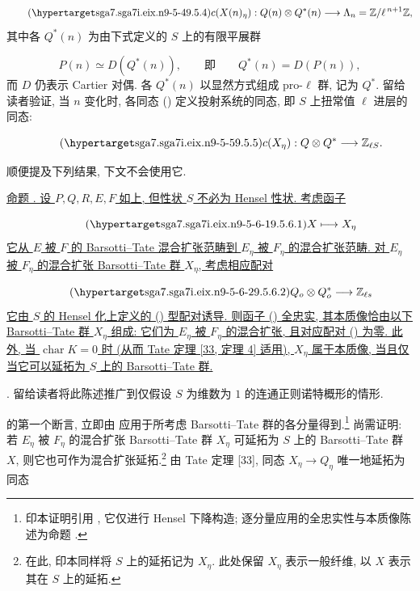 \begin{equation}\tag{\SGARefTarget{sga7.sga7i.eix.n9-5-4}{9.5.4}}
c(X(n)_\eta):Q(n)\otimes Q^*(n)
\longrightarrow\Lambda_n=\mathbb Z/\ell^{\,n+1}\mathbb Z,
\end{equation}
其中各 $Q^*(n)$ 为由下式定义的 $S$ 上的有限平展群

\begin{equation*}
P(n)\simeq D(Q^*(n)),
\qquad\text{即}\qquad Q^*(n)=D(P(n)),
\end{equation*}
而 $D$ 仍表示 Cartier 对偶. 各 $Q^*(n)$ 以显然方式组成 pro-$\ell$ 群, 记为 $Q^*$. 留给读者验证, 当 $n$ 变化时, 各同态 () 定义投射系统的同态, 即 $S$ 上扭常值 $\ell$ 进层的同态:

\begin{equation}\tag{\SGARefTarget{sga7.sga7i.eix.n9-5-5}{9.5.5}}
c(X_\eta):Q\otimes Q^*\longrightarrow\mathbb Z_{\ell S}.
\end{equation}

顺便提及下列结果, 下文不会使用它.

\medskip
\noindent
\underline{命题 . 设 $P,Q,R,E,F$ 如上, 但性状 $S$ 不必为 Hensel 性状. 考虑函子}

\begin{equation}\tag{\SGARefTarget{sga7.sga7i.eix.n9-5-6-1}{9.5.6.1}}
X\longmapsto X_\eta
\end{equation}
\underline{它从 $E$ 被 $F$ 的 Barsotti--Tate 混合扩张范畴到 $E_\eta$ 被 $F_\eta$ 的混合扩张范畴. 对 $E_\eta$ 被 $F_\eta$ 的混合扩张 Barsotti--Tate 群 $X_\eta$, 考虑相应配对}

\begin{equation}\tag{\SGARefTarget{sga7.sga7i.eix.n9-5-6-2}{9.5.6.2}}
Q_o\otimes Q_o^*\longrightarrow\mathbb Z_{\ell s}
\end{equation}
\underline{它由 $S$ 的 Hensel 化上定义的 () 型配对诱导. 则函子 () 全忠实, 其本质像恰由以下 Barsotti--Tate 群 $X_\eta$ 组成: 它们为 $E_\eta$ 被 $F_\eta$ 的混合扩张, 且对应配对 () 为零. 此外, 当 $\operatorname{char}K=0$ 时 (从而 Tate 定理 [33, 定理 4] 适用), $X_\eta$ 属于本质像, 当且仅当它可以延拓为 $S$ 上的 Barsotti--Tate 群.}

\medskip
\noindent
{}. 留给读者将此陈述推广到仅假设 $S$ 为维数为 $1$ 的连通正则诺特概形的情形.

 的第一个断言, 立即由  应用于所考虑 Barsotti--Tate 群的各分量得到.\footnote{印本证明引用 , 它仅进行 Hensel 下降构造; 逐分量应用的全忠实性与本质像陈述为命题 .} 尚需证明: 若 $E_\eta$ 被 $F_\eta$ 的混合扩张 Barsotti--Tate 群 $X_\eta$ 可延拓为 $S$ 上的 Barsotti--Tate 群 $X$, 则它也可作为混合扩张延拓.\footnote{在此, 印本同样将 $S$ 上的延拓记为 $X_\eta$. 此处保留 $X_\eta$ 表示一般纤维, 以 $X$ 表示其在 $S$ 上的延拓.} 由 Tate 定理 [33], 同态 $X_\eta\longrightarrow Q_\eta$ 唯一地延拓为同态

